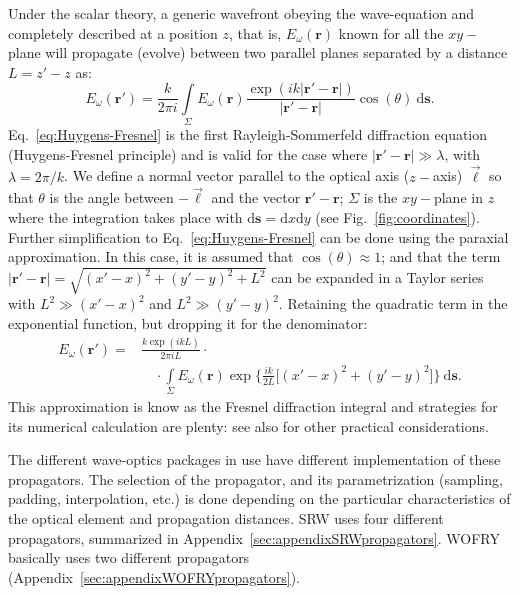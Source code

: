 \documentclass{iucr}              %
\begin{document}
Under the scalar theory, a generic wavefront obeying the wave-equation and completely described at a position $z$, that is, $E_\omega(\textbf{r})$ known for all the $xy-$plane will propagate (evolve) between two parallel planes separated by a distance $L=z'-z$ as: 
\begin{equation}\label{eq:Huygens-Fresnel}
    E_\omega(\textbf{r}') = \frac{k}{2\pi i}\int\limits_{\Sigma}{E_\omega(\textbf{r})\frac{\exp{(ik\vert\textbf{r}' - \textbf{r}\vert)}}{\vert\textbf{r}' - \textbf{r}\vert}\cos{(\theta)}~\mathrm{d}\textbf{s}}.
\end{equation}
Eq.~\ref{eq:Huygens-Fresnel} is the first Rayleigh-Sommerfeld diffraction equation (Huygens-Fresnel principle) and is valid for the case where $\vert\textbf{r}' - \textbf{r}\vert\gg\lambda$, with $\lambda=2\pi \big/ k$. We define a normal vector parallel to the optical axis ($z-$axis) $\vec{\ell}$ so that $\theta$ is the angle between $-\vec{\ell}$ and the vector $\textbf{r}'-\textbf{r}$; $\Sigma$ is the $xy-$plane in $z$ where the integration takes place with $\mathrm{d}\textbf{s}=\mathrm{d}x\mathrm{d}y$ (see Fig.~\ref{fig:coordinates}). Further simplification to Eq.~\ref{eq:Huygens-Fresnel} can be done using the paraxial approximation. In this case, it is assumed that $\cos{(\theta)}\approx1$; and that the term $\vert\textbf{r}' - \textbf{r}\vert=\sqrt{(x'-x)^2 + (y'-y)^2 + L^2}$ can be expanded in a Taylor series with $L^2\gg(x'-x)^2$ and $L^2\gg(y'-y)^2$. Retaining the quadratic term in the exponential function, but dropping it for the denominator:
\begin{equation}\label{eq:Fresnel}
\begin{split}
    E_\omega(\textbf{r}') = &\frac{k\exp{(ikL)}}{2\pi i L}\cdot \\
    &\quad\cdot\int\limits_{\Sigma}{E_\omega(\textbf{r})\exp{\bigg\{ \frac{ik}{2L}\big[ (x'-x)^2 + (y'-y)^2 \big]\bigg\}}~\mathrm{d}\textbf{s}}.
\end{split}
\end{equation}
This approximation is know as the Fresnel diffraction integral and strategies for its numerical calculation are plenty: \cite{Kelly2014,Goodman2017} see also \cite{Rees87, Stern2004, Zhang2020} for other practical considerations.

The different wave-optics packages in use have different implementation of these propagators. The selection of the propagator, and its parametrization (sampling, padding, interpolation, etc.) is done depending on the particular characteristics of the optical element and propagation distances. SRW uses four different propagators, summarized in Appendix~\ref{sec:appendixSRWpropagators}. WOFRY basically uses two different propagators (Appendix~\ref{sec:appendixWOFRYpropagators}).   
\end{document}
